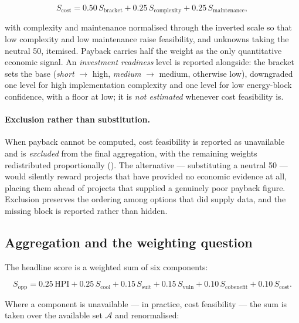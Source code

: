 \begin{equation}
\label{eq:cost-feasibility-rule}
S_{\mathrm{cost}} = 0.50\,S_{\mathrm{bracket}}
 + 0.25\,S_{\mathrm{complexity}} + 0.25\,S_{\mathrm{maintenance}},
\end{equation}

with complexity and maintenance normalised through the inverted scale so that
low complexity and low maintenance raise feasibility, and unknowns taking the
neutral 50, itemised. Payback carries half the weight as the only quantitative
economic signal. An \emph{investment readiness} level is reported alongside:
the bracket sets the base (\emph{short} $\rightarrow$ high, \emph{medium}
$\rightarrow$ medium, otherwise low), downgraded one level for high
implementation complexity and one level for low energy-block confidence, with a
floor at low; it is \emph{not estimated} whenever cost feasibility is.

\paragraph{Exclusion rather than substitution.} When payback cannot be
computed, cost feasibility is reported as unavailable and is \emph{excluded}
from the final aggregation, with the remaining weights redistributed
proportionally (). The alternative ---
substituting a neutral 50 --- would silently reward projects that have provided
no economic evidence at all, placing them ahead of projects that supplied a
genuinely poor payback figure. Exclusion preserves the ordering among options
that did supply data, and the missing block is reported rather than hidden.

\subsection{Aggregation and the weighting question}
\label{sec:aggregation}

The headline score is a weighted sum of six components:

\begin{equation}
\label{eq:aggregation}
S_{\mathrm{opp}} =
  0.25\,\mathrm{HPI}
+ 0.25\,S_{\mathrm{cool}}
+ 0.15\,S_{\mathrm{suit}}
+ 0.15\,S_{\mathrm{vuln}}
+ 0.10\,S_{\mathrm{cobenefit}}
+ 0.10\,S_{\mathrm{cost}} .
\end{equation}

Where a component is unavailable --- in practice, cost feasibility --- the sum
is taken over the available set $\mathcal{A}$ and renormalised:

